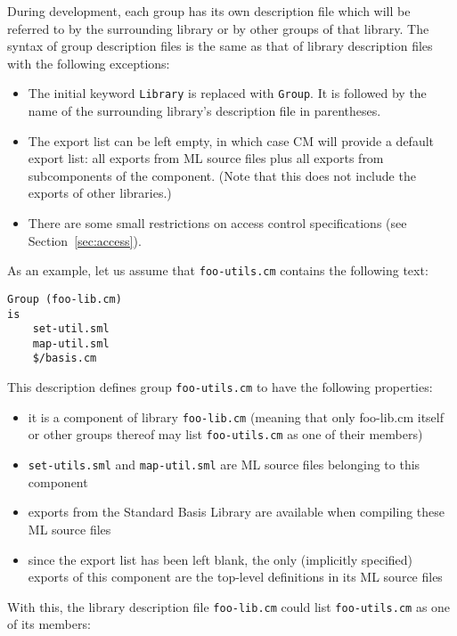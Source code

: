\documentclass[titlepage,letterpaper]{article}
\begin{document}
During development, each group has its own description file which will
be referred to by the surrounding library or by other groups of that
library. The syntax of group description files is the same as that of
library description files with the following exceptions:

\begin{itemize}
\item The initial keyword {\tt Library} is replaced with {\tt Group}.
It is followed by the name of the surrounding library's description
file in parentheses.
\item The export list can be left empty, in which case CM will provide
a default export list: all exports from ML source files plus all
exports from subcomponents of the component.  (Note that this does not
include the exports of other libraries.)
\item There are some small restrictions on access control
specifications (see Section~\ref{sec:access}).
\end{itemize}

As an example, let us assume that
{\tt foo-utils.cm} contains the following text:

\begin{verbatim}
Group (foo-lib.cm)
is
    set-util.sml
    map-util.sml
    $/basis.cm
\end{verbatim}

This description defines group {\tt foo-utils.cm} to have the
following properties:

\begin{itemize}
\item it is a component of library {\tt foo-lib.cm} (meaning that only
foo-lib.cm itself or other groups thereof may list {\tt foo-utils.cm} as one
of their members)
\item {\tt set-utils.sml} and {\tt map-util.sml} are ML source files
belonging to this component
\item exports from the Standard Basis Library are available when
compiling these ML source files
\item since the export list has been left blank, the only (implicitly
specified) exports of this component are the top-level definitions in
its ML source files
\end{itemize}

With this, the library description file {\tt foo-lib.cm} could list
{\tt foo-utils.cm} as one of its members:
\end{document}
